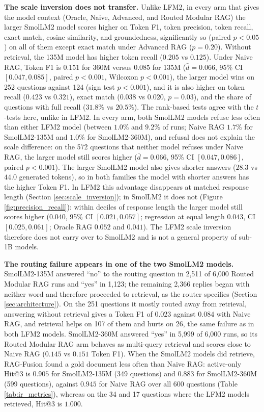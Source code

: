\documentclass[10pt]{article}
\begin{document}
\textbf{The scale inversion does not transfer.} Unlike LFM2, in every arm that gives the model context (Oracle, Naive, Advanced, and Routed Modular RAG) the larger SmolLM2 model scores higher on Token F1, token precision, token recall, exact match, cosine similarity, and groundedness, significantly so (paired $p<0.05$) on all of them except exact match under Advanced RAG ($p=0.20$). Without retrieval, the 135M model has higher token recall ($0.205$ vs $0.125$). Under Naive RAG, Token F1 is $0.151$ for 360M versus $0.085$ for 135M ($\bar{d}=0.066$, 95\% CI $[0.047, 0.085]$, paired $p<0.001$, Wilcoxon $p<0.001$), the larger model wins on 252 questions against 124 (sign test $p<0.001$), and it is also higher on token recall ($0.423$ vs $0.321$), exact match ($0.038$ vs $0.020$, $p=0.03$), and the share of questions with full recall ($31.8\%$ vs $20.5\%$). The rank-based tests agree with the $t$-tests here, unlike in LFM2. In every arm, both SmolLM2 models refuse less often than either LFM2 model (between $1.0\%$ and $9.2\%$ of runs; Naive RAG $1.7\%$ for SmolLM2-135M and $1.0\%$ for SmolLM2-360M), and refusal does not explain the scale difference: on the 572 questions that neither model refuses under Naive RAG, the larger model still scores higher ($\bar{d}=0.066$, 95\% CI $[0.047, 0.086]$, paired $p<0.001$). The larger SmolLM2 model also gives shorter answers ($28.3$ vs $44.0$ generated tokens), so in both families the model with shorter answers has the higher Token F1. In LFM2 this advantage disappears at matched response length (Section \ref{sec:scale_inversion}); in SmolLM2 it does not (Figure \ref{fig:precision_recall}): within deciles of response length the larger model still scores higher ($0.040$, 95\% CI $[0.021, 0.057]$; regression at equal length $0.043$, CI $[0.025, 0.061]$; Oracle RAG $0.052$ and $0.041$). The LFM2 scale inversion therefore does not carry over to SmolLM2 and is not a general property of sub-1B models.

\textbf{The routing failure appears in one of the two SmolLM2 models.} SmolLM2-135M answered ``no'' to the routing question in 2,511 of 6,000 Routed Modular RAG runs and ``yes'' in 1,123; the remaining 2,366 replies began with neither word and therefore proceeded to retrieval, as the router specifies (Section \ref{sec:architecture}). On the 251 questions it mostly routed away from retrieval, answering without retrieval gives a Token F1 of $0.023$ against $0.084$ with Naive RAG, and retrieval helps on 107 of them and hurts on 26, the same failure as in both LFM2 models. SmolLM2-360M answered ``yes'' in 5,999 of 6,000 runs, so its Routed Modular RAG arm behaves as multi-query retrieval and scores close to Naive RAG ($0.145$ vs $0.151$ Token F1). When the SmolLM2 models did retrieve, RAG-Fusion found a gold document less often than Naive RAG: active-only Hit@3 is $0.905$ for SmolLM2-135M (349 questions) and $0.883$ for SmolLM2-360M (599 questions), against $0.945$ for Naive RAG over all 600 questions (Table \ref{tab:ir_metrics}), whereas on the 34 and 17 questions where the LFM2 models retrieved, Hit@3 is $1.000$.
\end{document}
